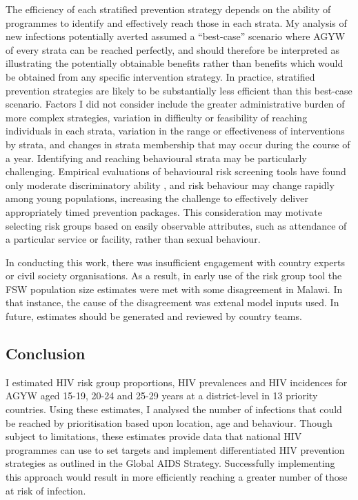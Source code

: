 \documentclass[a4paper, nobind]{templates/ociamthesis}
\begin{document}
The efficiency of each stratified prevention strategy depends on the ability of programmes to identify and effectively reach those in each strata.
My analysis of new infections potentially averted assumed a ``best-case'' scenario where AGYW of every strata can be reached perfectly, and should therefore be interpreted as illustrating the potentially obtainable benefits rather than benefits which would be obtained from any specific intervention strategy.
In practice, stratified prevention strategies are likely to be substantially less efficient than this best-case scenario.
Factors I did not consider include the greater administrative burden of more complex strategies, variation in difficulty or feasibility of reaching individuals in each strata, variation in the range or effectiveness of interventions by strata, and changes in strata membership that may occur during the course of a year.
Identifying and reaching behavioural strata may be particularly challenging.
Empirical evaluations of behavioural risk screening tools have found only moderate discriminatory ability \autocite{jia2022risk}, and risk behaviour may change rapidly among young populations, increasing the challenge to effectively deliver appropriately timed prevention packages.
This consideration may motivate selecting risk groups based on easily observable attributes, such as attendance of a particular service or facility, rather than sexual behaviour.

In conducting this work, there was insufficient engagement with country experts or civil society organisations.
As a result, in early use of the risk group tool the FSW population size estimates were met with some disagreement in Malawi.
In that instance, the cause of the disagreement was extenal model inputs used.
In future, estimates should be generated and reviewed by country teams.

\hypertarget{conclusion}{%
\subsection{Conclusion}\label{conclusion}}

I estimated HIV risk group proportions, HIV prevalences and HIV incidences for AGYW aged 15-19, 20-24 and 25-29 years at a district-level in 13 priority countries.
Using these estimates, I analysed the number of infections that could be reached by prioritisation based upon location, age and behaviour.
Though subject to limitations, these estimates provide data that national HIV programmes can use to set targets and implement differentiated HIV prevention strategies as outlined in the Global AIDS Strategy.
Successfully implementing this approach would result in more efficiently reaching a greater number of those at risk of infection.
\end{document}
